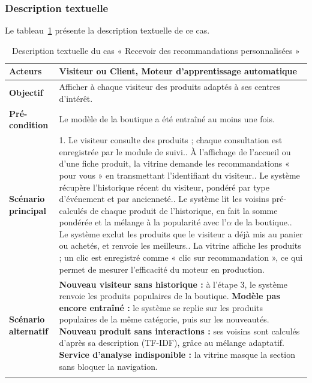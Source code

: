 \subsubsection{Description textuelle}
Le tableau~\ref{tab:uc-reco} présente la description textuelle de ce cas.
\renewcommand{\arraystretch}{1.5}
\begin{longtable}{|p{4cm}|p{11cm}|}
\hline
\textbf{Acteurs} & Visiteur ou Client, Moteur d'apprentissage automatique \\
\hline
\textbf{Objectif} & Afficher à chaque visiteur des produits adaptés à ses centres d'intérêt. \\
\hline
\textbf{Pré-condition} & Le modèle de la boutique a été entraîné au moins une fois. \\
\hline
\textbf{Scénario principal} &
1. Le visiteur consulte des produits ; chaque consultation est enregistrée par le module de suivi.\newline
2. À l'affichage de l'accueil ou d'une fiche produit, la vitrine demande les recommandations « pour vous » en transmettant l'identifiant du visiteur.\newline
3. Le système récupère l'historique récent du visiteur, pondéré par type d'événement et par ancienneté.\newline
4. Le système lit les voisins pré-calculés de chaque produit de l'historique, en fait la somme pondérée et la mélange à la popularité avec l'$\alpha$ de la boutique.\newline
5. Le système exclut les produits que le visiteur a déjà mis au panier ou achetés, et renvoie les meilleurs.\newline
6. La vitrine affiche les produits ; un clic est enregistré comme « clic sur recommandation », ce qui permet de mesurer l'efficacité du moteur en production. \\
\hline
\textbf{Scénario alternatif} &
\textbf{Nouveau visiteur sans historique :} à l'étape 3, le système renvoie les produits populaires de la boutique.\newline
\textbf{Modèle pas encore entraîné :} le système se replie sur les produits populaires de la même catégorie, puis sur les nouveautés.\newline
\textbf{Nouveau produit sans interactions :} ses voisins sont calculés d'après sa description (TF-IDF), grâce au mélange adaptatif.\newline
\textbf{Service d'analyse indisponible :} la vitrine masque la section sans bloquer la navigation. \\
\hline
\caption{Description textuelle du cas « Recevoir des recommandations personnalisées »}
\label{tab:uc-reco}
\end{longtable}

